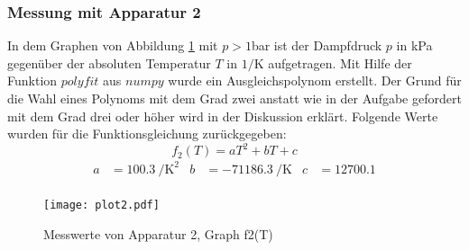 \newpage

 \subsubsection{Messung mit Apparatur 2}
\label{sec: MmA2}
In dem Graphen von Abbildung \ref{fig:f2(T)} mit $p > 1$\si{\bar} ist der
Dampfdruck
$p$ in \si{\kPa} gegenüber der absoluten Temperatur $T$ in $1/\si{\kelvin}$
aufgetragen. Mit Hilfe der Funktion $polyfit$ aus $numpy$ wurde ein
Ausgleichspolynom erstellt. Der Grund für die Wahl eines
Polynoms mit dem Grad zwei anstatt wie in der Aufgabe gefordert mit dem Grad
drei oder höher wird in der Diskussion erklärt.
Folgende Werte wurden für die Funktionsgleichung zurückgegeben:
\begin{equation}
  f_2(T) = aT^2 + bT + c
\end{equation}
\begin{align}
  a & = \SI{100.3}{\per\kelvin\tothe{2}} & b & =
  \SI{-71186.3}{\per\kelvin} & c & = 12700.1 \\
\end{align}

\begin{figure}[h]
  \centering
  \texttt{[image: plot2.pdf]}
  \caption{Messwerte von Apparatur 2, Graph f2(T)}
  \label{fig:f2(T)}
\end{figure}

